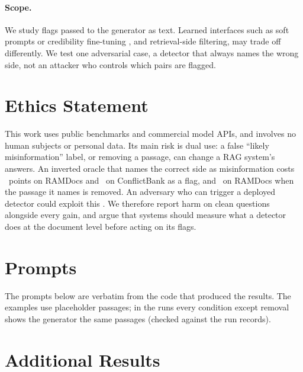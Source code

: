 \paragraph{Scope.} We study flags passed to the generator as text. Learned interfaces such as soft prompts or
credibility fine-tuning \citep{ye2026tcr,pan2024credibility}, and retrieval-side filtering, may trade off differently. We test one adversarial case, a detector that always names the wrong side, not an attacker who controls
which pairs are flagged.

\section*{Ethics Statement}
This work uses public benchmarks and commercial model APIs, and involves no human subjects or personal data. Its main
risk is dual use: a false ``likely misinformation'' label, or removing a passage, can
change a RAG system's answers. An inverted oracle that names the correct side as misinformation costs \aadvDirConf\
points on RAMDocs and \azCbMiniOracleInvFlagDirectionalConflict\ on ConflictBank as a flag, and \aadvRemConf\ on
RAMDocs when the passage it names is removed. An adversary who can trigger a deployed detector could exploit this
\citep{zou2025poisonedrag}. We therefore report harm on clean questions alongside every gain, and argue that
systems should measure what a detector does at the document level before acting on its flags.
\section{Prompts}
\label{app:prompts}
The prompts below are verbatim from the code that produced the results. The examples use placeholder passages; in the runs every condition except removal shows the generator the same passages (checked against the run records).


\section{Additional Results}
\label{app:extra}

